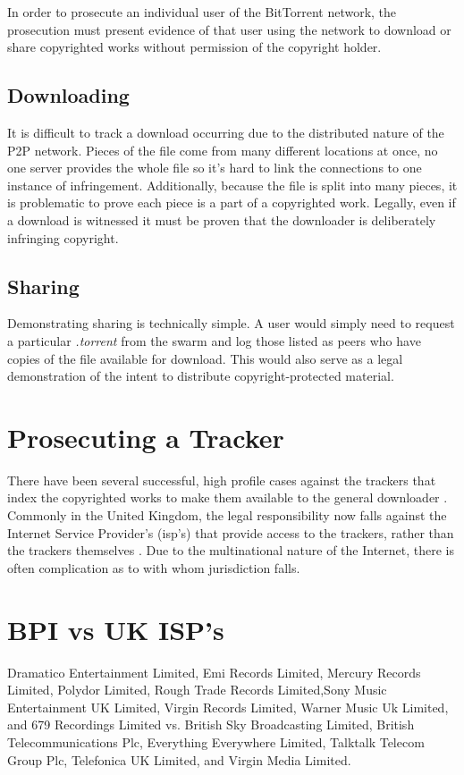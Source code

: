 \begin{appendices}
In order to prosecute an individual user of the BitTorrent network, the prosecution must present evidence of that user using the network to download or share copyrighted works without permission of the copyright holder.

\subsection{Downloading}
It is difficult to track a download occurring due to the distributed nature of the P2P network.
Pieces of the file come from many different locations at once, no one server provides the whole file so it's hard to link the connections to one instance of infringement. Additionally, because the file is split into many pieces, it is problematic to prove each piece is a part of a copyrighted work. Legally, even if a download is witnessed it must be proven that the downloader is deliberately infringing copyright.

\subsection{Sharing}
Demonstrating sharing is technically simple. A user would simply need to request a particular \textit{.torrent} from the \gls{swarm} and log those listed as peers who have copies of the file available for download. This would also serve as a legal demonstration of the intent to distribute copyright-protected material.

\section{Prosecuting a Tracker}
There have been several successful, high profile cases against the \glspl{tracker} that index the copyrighted works to make them available to the general downloader \citep{fungvsmpaa}.
Commonly in the United Kingdom, the legal responsibility now falls against the Internet Service Provider's (\gls{isp}'s)  that provide access to the \glspl{tracker}, rather than the \glspl{tracker} themselves \citep{bpivsukisps}. Due to the multinational nature of the Internet, there is often complication as to with whom jurisdiction falls.

\section{BPI vs UK ISP's} \label{app:bpiVtpb}

Dramatico Entertainment Limited, Emi Records Limited, Mercury Records Limited, Polydor Limited, Rough Trade Records Limited,Sony Music Entertainment UK Limited, Virgin Records Limited, Warner Music Uk Limited, and 679 Recordings Limited vs. British Sky Broadcasting Limited, British Telecommunications Plc, Everything Everywhere Limited, Talktalk Telecom Group Plc, Telefonica UK Limited, and Virgin Media Limited.


\end{appendices}
